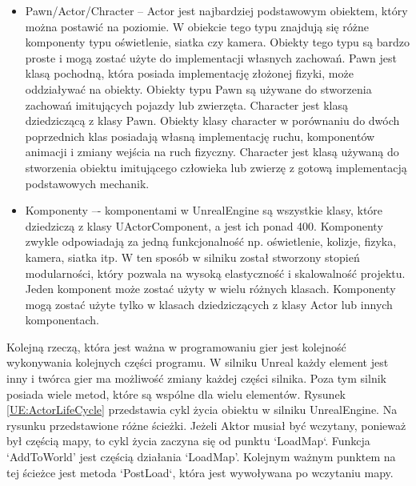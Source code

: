\documentclass[12pt,twoside]{article}
\begin{document}
\begin{itemize}
\item Pawn/Actor/Chracter -- Actor jest najbardziej podstawowym obiektem, który
można postawić na poziomie. W obiekcie tego typu znajdują się różne komponenty
typu oświetlenie, siatka czy kamera. Obiekty tego typu są bardzo proste i mogą
zostać użyte do implementacji własnych zachowań. Pawn jest klasą pochodną, która
posiada implementację złożonej fizyki, może oddziaływać na obiekty. Obiekty typu
Pawn są używane do stworzenia zachowań imitujących pojazdy lub zwierzęta.
Character jest klasą dziedziczącą z klasy Pawn. Obiekty klasy character w
porównaniu do dwóch poprzednich klas posiadają własną implementację ruchu,
komponentów animacji i zmiany wejścia na ruch fizyczny. Character jest klasą
używaną do stworzenia obiektu imitującego człowieka lub zwierzę z gotową
implementacją podstawowych mechanik.\cite{UE:Actor,UE:Pawn,UE:Character} 

\item Komponenty –- komponentami w UnrealEngine są wszystkie klasy, które
dziedziczą z klasy UActorComponent, a jest ich ponad 400. Komponenty zwykle
odpowiadają za jedną funkcjonalność np. oświetlenie, kolizje, fizyka, kamera,
siatka itp.  W ten sposób w silniku został stworzony stopień modularności, który
pozwala na wysoką elastyczność i skalowalność projektu. Jeden komponent może
zostać użyty w wielu różnych klasach. Komponenty mogą zostać użyte tylko w
klasach dziedziczących z klasy Actor lub innych komponentach.\cite{UE:Component}


\end{itemize}

Kolejną rzeczą, która jest ważna w programowaniu gier jest kolejność wykonywania
kolejnych części programu. W silniku Unreal każdy element jest inny i twórca
gier ma możliwość zmiany każdej części silnika. Poza tym silnik posiada wiele
metod, które są wspólne dla wielu elementów. Rysunek \ref{UE:ActorLifeCycle}
przedstawia cykl życia obiektu w silniku UnrealEngine. Na rysunku przedstawione
różne ścieżki. Jeżeli Aktor musiał być wczytany, ponieważ był częścią mapy, to
cykl życia zaczyna się od punktu `LoadMap`. Funkcja ‘AddToWorld’ jest częścią
działania ‘LoadMap’. Kolejnym ważnym punktem na tej ścieżce jest metoda
`PostLoad`, która jest wywoływana po wczytaniu mapy. 
\end{document}
